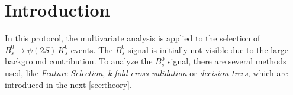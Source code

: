 \section{Introduction}
\label{sec:intro}
In this protocol, the multivariate analysis is applied to the selection of $B_s^0 \to \psi \left(2S\right)\, K_s^0$ events. The $B_s^0$ signal is initially not visible due to the large background contribution. To analyze the $B_s^0$ signal, there are several methods used, like \textit{Feature Selection}, \textit{k-fold cross validation} or \textit{decision trees}, which are introduced in the next \autoref{sec:theory}.